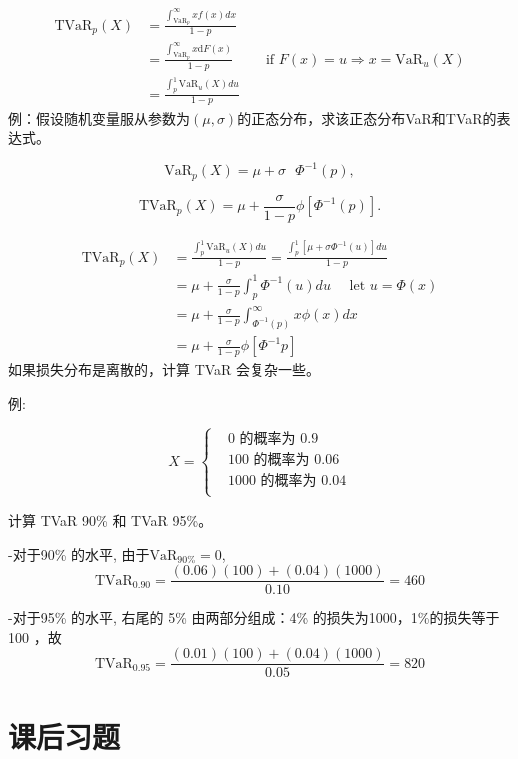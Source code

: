 \documentclass[
]{book}
\begin{document}
\[
\begin{align*}
  \text{TVa}{{\text{R}}_{p}}(X)& =\frac{\int_{\text{Va}{{\text{R}}_{p}}}^{\infty }{xf(x)dx}}{1-p}\text{   } \\ 
 & =\frac{\int_{\text{Va}{{\text{R}}_{p}}}^{\infty }{x\text{d}F(x)}}{1-p}
 \quad\quad
 \text{            if   }F(x)=u\Rightarrow x=\text{Va}{{\text{R}}_{u}}(X) \\ 
 & =\frac{\int_{p}^{1}{\text{Va}{{\text{R}}_{u}}(X)du}}{1-p}  
\end{align*}
\]
例：假设随机变量服从参数为\((\mu,\sigma)\)的正态分布，求该正态分布VaR和TVaR的表达式。

\[
\text{Va}{{\text{R}}_{p}}(X)=\mu +\sigma \text{ }{{\Phi }^{-1}}(p),
\]

\[
\text{TVa}{{\text{R}}_{p}}(X)=\mu +\frac{\sigma }{1-p}\phi \left[ {{\Phi }^{-1}}(p) \right].
\]

\[
\begin{align*}
  \text{TVa}{{\text{R}}_{p}}(X)& =\frac{\int_{p}^{1}{\text{Va}{{\text{R}}_{u}}(X)du}}{1-p}=\frac{\int_{p}^{1}{\left[ \mu +\sigma {{\Phi }^{-1}}(u) \right]du}}{1-p} \\ 
 & =\mu +\frac{\sigma }{1-p}\int_{p}^{1}{{{\Phi }^{-1}}(u)du}
 \quad \text{      let }u=\Phi (x) \\ 
 & =\mu +\frac{\sigma }{1-p}\int_{{{\Phi }^{-1}}(p)}^{\infty }{x\phi (x)dx} \\ 
 & =\mu +\frac{\sigma }{1-p}\phi \left[ {{\Phi }^{-1}}p \right]
\end{align*}
\]
如果损失分布是离散的，计算 TVaR 会复杂一些。

例:

\[
X=\begin{cases}
  & 0\text{           的概率为  0}\text{.9} \\ 
 & 100\text{      的概率为   0}\text{.06} \\ 
 & 1000\text{    的概率为   0}\text{.04} \\ 
\end{cases} 
\]

计算 TVaR 90\% 和 TVaR 95\%。

-对于90\% 的水平, 由于\(\text{VaR}_{90\%}=0\), \[\text{TVa}{{\text{R}}_{0.90}}=\frac{(0.06)(100)+(0.04)(1000)}{0.10}=460\]

-对于95\% 的水平, 右尾的 5\% 由两部分组成：4\% 的损失为1000，1\%的损失等于100 ，故
\[
\text{TVa}{{\text{R}}_{0.95}}=\frac{(0.01)(100)+(0.04)(1000)}{0.05}=820
\]

\hypertarget{ux8bfeux540eux4e60ux9898-1}{%
\section{课后习题}\label{ux8bfeux540eux4e60ux9898-1}}
\end{document}
